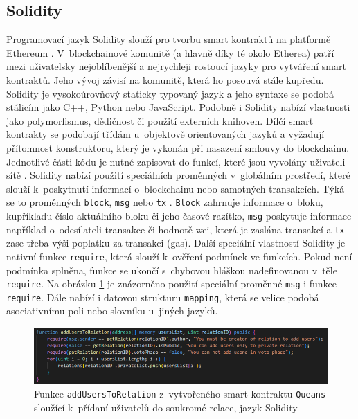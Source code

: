 \subsection*{Solidity}
Programovací jazyk Solidity slouží pro tvorbu smart kontraktů na platformě Ethereum \cite{solidity1}. V~blockchainové komunitě (a hlavně díky té okolo Etherea) patří mezi uživatelsky nejoblíbenější a nejrychleji rostoucí jazyky pro vytváření smart kontraktů. Jeho vývoj závisí na komunitě, která ho posouvá stále kupředu. Solidity je vysokoúrovňový staticky typovaný jazyk a jeho syntaxe se podobá stálicím jako C++, Python nebo JavaScript. Podobně i Solidity nabízí vlastnosti jako polymorfismus, dědičnost či použití externích knihoven. 
Dílčí smart kontrakty se podobají třídám u~objektově orientovaných jazyků a vyžadují přítomnost konstruktoru, který je vykonán při nasazení smlouvy do blockchainu. Jednotlivé části kódu je nutné zapisovat do funkcí, které jsou vyvolány uživateli sítě \cite{WohrerZdun}. Solidity nabízí použití speciálních proměnných v~globálním prostředí, které slouží k~poskytnutí informací o~blockchainu nebo samotných transakcích. Týká se to proměnných \texttt{block}, \texttt{msg} nebo \texttt{tx} \cite{eth_variables}. \texttt{Block} zahrnuje informace o~bloku, kupříkladu číslo aktuálního bloku či jeho časové razítko, \texttt{msg} poskytuje informace například o~odesílateli transakce či hodnotě wei, která je zaslána transakcí a \texttt{tx} zase třeba výši poplatku za transakci (gas). Další speciální vlastností Solidity je nativní funkce \texttt{require}, která slouží k~ověření podmínek ve funkcích. Pokud není podmínka splněna, funkce se ukončí s~chybovou hláškou nadefinovanou v~těle \texttt{require}. Na obrázku \ref{fig:solidity} je znázorněno použití speciální proměnné \texttt{msg} i funkce \texttt{require}. Dále nabízí i datovou strukturu \texttt{mapping}, která se velice podobá asociativnímu poli nebo slovníku u~jiných jazyků. 
\begin{figure}
\centering
\includegraphics[width=\textwidth]{obrazky/Solidity.png}
\caption{Funkce \texttt{addUsersToRelation} z~vytvořeného smart kontraktu \texttt{Queans} sloužící k~přídaní uživatelů do soukromé relace, jazyk Solidity}
\label{fig:solidity}
\end{figure}

